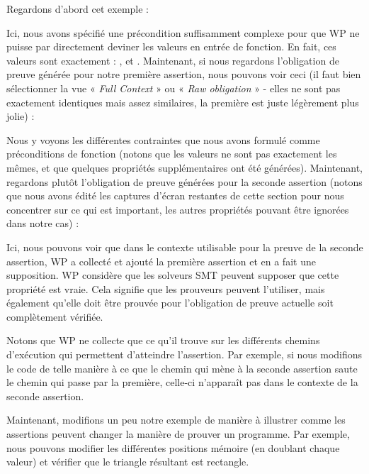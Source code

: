 


Regardons d'abord cet exemple :





Ici, nous avons spécifié une précondition suffisamment complexe pour que WP ne
puisse par directement deviner les valeurs en entrée de fonction. En fait, ces
valeurs sont exactement : ,  et
. Maintenant, si nous regardons l'obligation de preuve générée
pour notre première assertion, nous pouvons voir ceci (il faut bien sélectionner
la vue « \textit{Full Context} » ou « \textit{Raw obligation} » - elles ne sont pas exactement
identiques mais assez similaires, la première est juste légèrement plus jolie) :




Nous y voyons les différentes contraintes que nous avons formulé comme préconditions
de fonction (notons que les valeurs ne sont pas exactement les mêmes, et que quelques
propriétés supplémentaires ont été générées). Maintenant, regardons plutôt
l'obligation de preuve générées pour la seconde assertion (notons que nous avons
édité les captures d'écran restantes de cette section pour nous concentrer sur ce
qui est important, les autres propriétés pouvant être ignorées dans notre cas) :




Ici, nous pouvons voir que dans le contexte utilisable pour la preuve de la seconde
assertion, WP a collecté et ajouté la première assertion et en a fait une supposition.
WP considère que les solveurs SMT peuvent supposer que cette propriété est vraie.
Cela signifie que les prouveurs peuvent l'utiliser, mais également qu'elle doit être
prouvée pour l'obligation de preuve actuelle soit complètement vérifiée.


Notons que WP ne collecte que ce qu'il trouve sur les différents chemins d'exécution
qui permettent d'atteindre l'assertion. Par exemple, si nous modifions le code de
telle manière à ce que le chemin qui mène à la seconde assertion saute le chemin qui
passe par la première, celle-ci n'apparaît pas dans le contexte de la seconde assertion.






Maintenant, modifions un peu notre exemple de manière à illustrer comme les
assertions peuvent changer la manière de prouver un programme. Par exemple, nous
pouvons modifier les différentes positions mémoire (en doublant chaque valeur) et
vérifier que le triangle résultant est rectangle.


